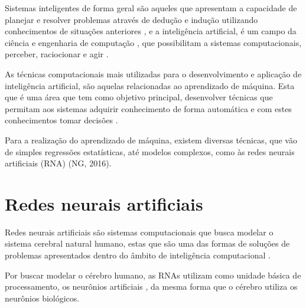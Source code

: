 \par Sistemas inteligentes de forma geral são aqueles que apresentam a capacidade de planejar e resolver problemas através de dedução e indução utilizando conhecimentos de situações anteriores \cite{VonZuben2013}, e a inteligência artificial, é um campo da ciência e engenharia de computação \cite{VonZuben2013}, que possibilitam a sistemas computacionais, perceber, raciocionar e agir \cite{Winston1992}.

\par As técnicas computacionais mais utilizadas para o desenvolvimento e aplicação de inteligência artificial, são aquelas relacionadas ao aprendizado de máquina. Esta que é uma área que tem como objetivo principal, desenvolver técnicas que permitam aos sistemas adquirir conhecimento de forma automática e com estes conhecimentos tomar decisões \cite{Augusto2007}.

\par Para a realização do aprendizado de máquina, existem diversas técnicas, que vão de simples regressões estatísticas, até modelos complexos, como às redes neurais artificiais (RNA) (NG, 2016).

\section{Redes neurais artificiais}


\par Redes neurais artificiais são sistemas computacionais que busca modelar o sistema cerebral natural humano, estas que são uma das formas de soluções de problemas apresentados dentro do âmbito de inteligência computacional \cite{Cintra2019}.

\par Por buscar modelar o cérebro humano, as RNAs utilizam como unidade básica de processamento, os neurônios artificiais \cite{Haykin2001}, da mesma forma que o cérebro utiliza os neurônios biológicos. %

